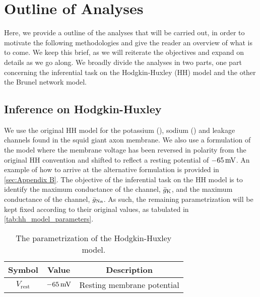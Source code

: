 \section{Outline of Analyses}

Here, we provide a outline of the analyses that will be carried out, in order to motivate the following methodologies and give the reader an overview of what is to come. We keep this brief, as we will reiterate the objectives and expand on details as we go along. We broadly divide the analyses in two parts, one part concerning the inferential task on the Hodgkin-Huxley (HH) model and the other the Brunel network model. 

\subsection{Inference on Hodgkin-Huxley}

We use the original HH model for the potassium (\K), sodium (\Na) and leakage channels found in the squid giant axon membrane. We also use a formulation of the model where the membrane voltage has been reversed in polarity from the original HH convention and shifted to reflect a resting potential of $-65 \,\mathrm{mV}$. An example of how to arrive at the alternative formulation is provided in \autoref{sec:Appendix B}. The objective of the inferential task on the HH model is to identify the maximum conductance of the \K channel, $\bar{g}_{\mathrm{K}}$, and the maximum conductance of the \Na channel, $\bar{g}_{\mathrm{Na}}$. As such, the remaining parametrization will be kept fixed according to their original values, as tabulated in \autoref{tab:hh_model_parameters}.

\begin{table}[!htb]
  \caption{The parametrization of the Hodgkin-Huxley model.}
  \begin{center}
    \begin{tabular}{ccc}
      \toprule
      \textbf{Symbol} & \textbf{Value} & \textbf{Description} \\
      \midrule
      $V_\mathrm{rest}$ &  $-65 \,\mathrm{mV}$ & Resting membrane potential \\
      \bottomrule
    \end{tabular}
  \end{center}
  \label{tab:hh_model_parameters}
\end{table}

